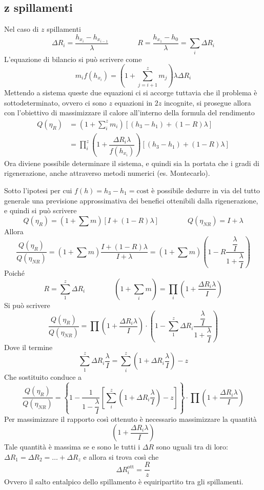 \subsection{z spillamenti}
\begin{adjustwidth}{2in}{}
	Nel caso di $z$ spillamenti
	\[\Delta R_i = \dfrac{h_{x_i} - h_{x_{i-1}}}{\lambda} \qquad \qquad R = \dfrac{h_{x_1}-h_0}{\lambda} = \sum_i\Delta R_i\]
	L'equazione di bilancio si può scrivere come 
	\[m_if(h_{x_i}) = \left(1+\sum_{j=i+1}^{z}m_j\right)\lambda\Delta R_i\]
	Mettendo a sistema queste due equazioni ci si accorge tuttavia che il problema è sottodeterminato, ovvero ci sono $z$ equazioni in $2z$ incognite, si prosegue allora con l'obiettivo di massimizzare il calore all'interno della formula del rendimento
	\[\begin{split}
		Q(\eta_R) & = \left(1+\sum_{i}^{z}m_i\right)[(h_3-h_1) + (1-R)\lambda] \\
		& = \prod_{i}^{z}\left(1+\dfrac{\Delta R_i\lambda}{f(h_{x_i})}\right)[(h_3-h_1) + (1-R)\lambda]
	\end{split}\]
	Ora diviene possibile determinare il sistema, e quindi sia la portata che i gradi di rigenerazione, anche attraverso metodi numerici (es. Montecarlo). \newline
	
	Sotto l'ipotesi per cui $f(h) = h_3-h_1 = \text{cost}$ è possibile dedurre in via del tutto generale una previsione approssimativa dei benefici ottenibili dalla rigenerazione, e quindi si può scrivere
	\[Q(\eta_R) = (1+\sum m)[I+(1-R)\lambda] \qquad\qquad Q(\eta_{NR}) = I + \lambda\]
	Allora 
	\[\dfrac{Q(\eta_R)}{Q(\eta_{NR})} = (1+\sum m)\dfrac{I+(1-R)\lambda}{I + \lambda} = (1+\sum m)\left(1-R\dfrac{\dfrac{\lambda}{I}}{1+\dfrac{\lambda}{I}}\right)\]
	Poiché 
	\[R = \sum_1^z\Delta R_i \qquad\qquad \left(1+\sum_i m\right) = \prod_i\left(1+\dfrac{\Delta R_i\lambda}{I}\right)\]
	Si può scrivere 
	\[\dfrac{Q(\eta_R)}{Q(\eta_{NR})} = \prod\left(1+\dfrac{\Delta R_i\lambda}{I}\right)\cdot \left(1-\sum_1^z\Delta R_i\dfrac{\dfrac{\lambda}{I}}{1+\dfrac{\lambda}{I}}\right)\]
	Dove il termine 
	\[\sum_1^z\Delta R_i \dfrac{\lambda}{I} = \sum_i^z\left(1+\Delta R_i\dfrac{\lambda}{I}\right)-z \]
	Che sostituito conduce a 
	\[\dfrac{Q(\eta_R)}{Q(\eta_{NR})} = \left\{1-\dfrac{1}{1-\dfrac{\lambda}{I}}\left[\sum_i^z\left(1+\Delta R_i\dfrac{\lambda}{I}\right)-z\right]\right\}\cdot\prod\left(1+\dfrac{\Delta R_i\lambda}{I}\right)\]
	Per massimizzare il rapporto così ottenuto è necessario massimizzare la quantità 
	\[\left(1+\dfrac{\Delta R_i\lambda}{I}\right)\]
	Tale quantità è massima se e sono le tutti i $\Delta R$ sono uguali tra di loro: $\Delta R_1 = \Delta R_2 = \dots + \Delta R_z$ e allora si trova così che 
	\[\Delta R_i^\text{ott} = \dfrac{R}{z}\]
	Ovvero il salto entalpico dello spillamento è equiripartito tra gli spillamenti. \newline 
	

\end{adjustwidth}
